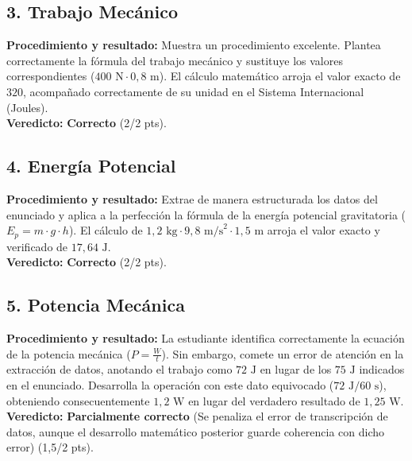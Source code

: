 \documentclass[12pt,letterpaper]{article}
\begin{document}
\subsection*{3. Trabajo Mecánico}
\textbf{Procedimiento y resultado:} Muestra un procedimiento excelente. Plantea correctamente la fórmula del trabajo mecánico y sustituye los valores correspondientes ($400 \text{ N} \cdot 0,8 \text{ m}$). El cálculo matemático arroja el valor exacto de $320$, acompañado correctamente de su unidad en el Sistema Internacional (Joules). \\
\textbf{Veredicto:} \textbf{Correcto} (2/2 pts).

\subsection*{4. Energía Potencial}
\textbf{Procedimiento y resultado:} Extrae de manera estructurada los datos del enunciado y aplica a la perfección la fórmula de la energía potencial gravitatoria ($E_p = m \cdot g \cdot h$). El cálculo de $1,2 \text{ kg} \cdot 9,8 \text{ m/s}^2 \cdot 1,5 \text{ m}$ arroja el valor exacto y verificado de $17,64 \text{ J}$. \\
\textbf{Veredicto:} \textbf{Correcto} (2/2 pts).

\subsection*{5. Potencia Mecánica}
\textbf{Procedimiento y resultado:} La estudiante identifica correctamente la ecuación de la potencia mecánica ($P = \frac{W}{t}$). Sin embargo, comete un error de atención en la extracción de datos, anotando el trabajo como $72 \text{ J}$ en lugar de los $75 \text{ J}$ indicados en el enunciado. Desarrolla la operación con este dato equivocado ($72 \text{ J} / 60 \text{ s}$), obteniendo consecuentemente $1,2 \text{ W}$ en lugar del verdadero resultado de $1,25 \text{ W}$. \\
\textbf{Veredicto:} \textbf{Parcialmente correcto} (Se penaliza el error de transcripción de datos, aunque el desarrollo matemático posterior guarde coherencia con dicho error) (1,5/2 pts).

\vspace{0.5cm}
\end{document}
